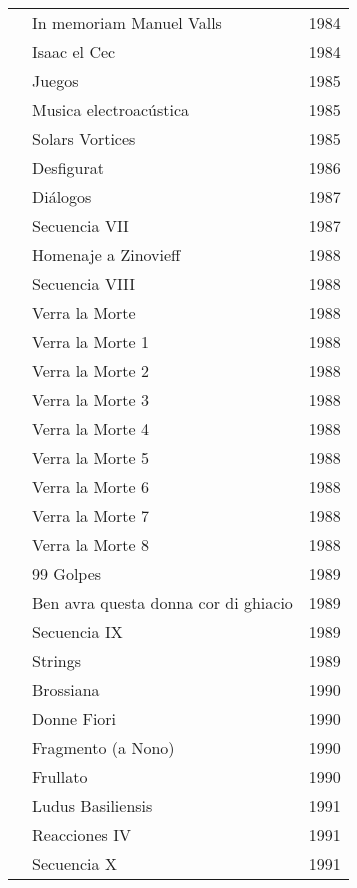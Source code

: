\begin{center}
\begin{longtable}{ p{}  p{}  p{} }
& In memoriam Manuel Valls & 1984 \\ \cmidrule (r){2-3} 
& Isaac el Cec & 1984 \\ \cmidrule (r){2-3} 
& Juegos & 1985 \\ \cmidrule (r){2-3} 
& Musica electroacústica & 1985 \\ \cmidrule (r){2-3} 
& Solars Vortices & 1985 \\ \cmidrule (r){2-3} 
& Desfigurat & 1986 \\ \cmidrule (r){2-3} 
& Diálogos & 1987 \\ \cmidrule (r){2-3} 
& Secuencia VII & 1987 \\ \cmidrule (r){2-3} 
& Homenaje a Zinovieff & 1988 \\ \cmidrule (r){2-3} 
& Secuencia VIII & 1988 \\ \cmidrule (r){2-3} 
& Verra la Morte & 1988 \\ \cmidrule (r){2-3} 
& Verra la Morte 1 & 1988 \\ \cmidrule (r){2-3} 
& Verra la Morte 2 & 1988 \\ \cmidrule (r){2-3} 
& Verra la Morte 3 & 1988 \\ \cmidrule (r){2-3} 
& Verra la Morte 4 & 1988 \\ \cmidrule (r){2-3} 
& Verra la Morte 5 & 1988 \\ \cmidrule (r){2-3} 
& Verra la Morte 6 & 1988 \\ \cmidrule (r){2-3} 
& Verra la Morte 7 & 1988 \\ \cmidrule (r){2-3} 
& Verra la Morte 8 & 1988 \\ \cmidrule (r){2-3} 
& 99 Golpes & 1989 \\ \cmidrule (r){2-3} 
& Ben avra questa donna cor di ghiacio & 1989 \\ \cmidrule (r){2-3} 
& Secuencia IX & 1989 \\ \cmidrule (r){2-3} 
& Strings & 1989 \\ \cmidrule (r){2-3} 
& Brossiana & 1990 \\ \cmidrule (r){2-3} 
& Donne Fiori & 1990 \\ \cmidrule (r){2-3} 
& Fragmento (a Nono) & 1990 \\ \cmidrule (r){2-3} 
& Frullato & 1990 \\ \cmidrule (r){2-3} 
& Ludus Basiliensis & 1991 \\ \cmidrule (r){2-3} 
& Reacciones IV & 1991 \\ \cmidrule (r){2-3} 
& Secuencia X & 1991 \\ \cmidrule (r){2-3} 

\end{longtable}
\end{center}
